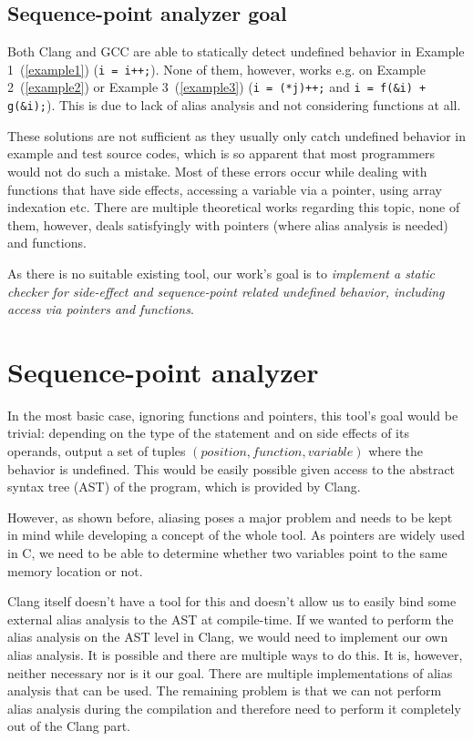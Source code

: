 \section{Sequence-point analyzer goal}
Both Clang and GCC are able to statically detect undefined behavior in Example 1~(\ref{example1}) (\verb|i = i++;|). None of them, however, works e.g. on Example 2~(\ref{example2}) or Example 3~(\ref{example3}) (\verb|i = (*j)++;| and \verb|i = f(&i) + g(&i);|). This is due to lack of alias analysis and not considering functions at all.

These solutions are not sufficient as they usually only catch undefined behavior in example and test source codes, which is so apparent that most programmers would not do such a mistake. Most of these errors occur while dealing with functions that have side effects, accessing a variable via a pointer, using array indexation etc.
There are multiple theoretical works regarding this topic, none of them, however, deals satisfyingly with pointers (where alias analysis is needed)~\cite{aliasAnalysis} and functions.

As there is no suitable existing tool, our work's goal is to \emph{implement a static checker for side-effect and sequence-point related undefined behavior, including access via pointers and functions}.

\chapter{Sequence-point analyzer}
In the most basic case, ignoring functions and pointers, this tool's goal would be trivial: depending on the type of the statement and on side effects of its operands, output a set of tuples $(position, function, variable)$ where the behavior is undefined. This would be easily possible given access to the abstract syntax tree (AST) of the program, which is provided by Clang.

However, as shown before, aliasing poses a major problem and needs to be kept in mind while developing a concept of the whole tool. As pointers are widely used in C, we need to be able to determine whether two variables point to the same memory location or not.

Clang itself doesn't have a tool for this and doesn't allow us to easily bind some external alias analysis to the AST at compile-time. If we wanted to perform the alias analysis on the AST level in Clang, we would need to implement our own alias analysis. It is possible and there are multiple ways to do this. It is, however, neither necessary nor is it our goal. There are multiple implementations  of alias analysis that can be used. The remaining problem is that we can not perform alias analysis during the compilation and therefore need to perform it completely out of the Clang part.

